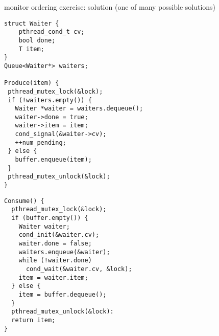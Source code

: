 \iftoggle{heldback}{\excludecomment{isheldback}}{\includecomment{isheldback}}
\begin{isheldback}
\begin{frame}[fragile,label=monitorOrderExerciseSln]{monitor ordering exercise: solution}
\small (one of many possible solutions) \\
\begin{minipage}{0.45\textwidth}
\begin{lstlisting}[basicstyle=\tt\fontsize{9.5}{10.5}\selectfont]
struct Waiter {
    pthread_cond_t cv;
    bool done;
    T item;    
}
Queue<Waiter*> waiters;

Produce(item) {
 pthread_mutex_lock(&lock);
 if (!waiters.empty()) {
   Waiter *waiter = waiters.dequeue();
   waiter->done = true;
   waiter->item = item;
   cond_signal(&waiter->cv);
   ++num_pending;
 } else {
   buffer.enqueue(item);
 }
 pthread_mutex_unlock(&lock);
}
\end{lstlisting}
\end{minipage}
\begin{minipage}{0.45\textwidth}
\begin{lstlisting}[basicstyle=\tt\fontsize{9.5}{10.5}\selectfont]
Consume() {
  pthread_mutex_lock(&lock);
  if (buffer.empty()) {
    Waiter waiter;
    cond_init(&waiter.cv);
    waiter.done = false;
    waiters.enqueue(&waiter);
    while (!waiter.done)
      cond_wait(&waiter.cv, &lock);
    item = waiter.item;
  } else {
    item = buffer.dequeue();
  }
  pthread_mutex_unlock(&lock):
  return item;
}
\end{lstlisting}
\end{minipage}
\end{frame}
\end{isheldback}
